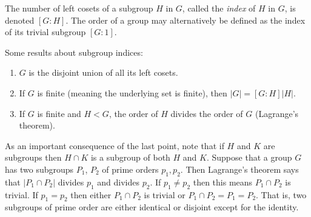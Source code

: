 \begin{defn}
The number of left cosets of a subgroup $H$ in $G$, called the \emph{index} of
$H$ in $G$, is denoted $[G:H]$. The order of a group may alternatively
be defined as the index of its trivial subgroup $[G : 1]$.
\end{defn}

\begin{corol}
Some results about subgroup indices:
\begin{enumerate}
  \item{$G$ is the disjoint union of all its left cosets.}
  \item{If $G$ is finite (meaning the underlying set is finite), then
        $|G| = [G:H] |H|$.}
  \item{If $G$ is finite and $H < G$, the order of $H$ divides the
        order of $G$ (Lagrange's theorem).}
\end{enumerate}
\end{corol}

As an important consequence of the last point, note that if $H$ and
$K$ are subgroups then $H \cap K$ is a subgroup of both $H$ and
$K$. Suppose that a group $G$ has two subgroups
$P_1$, $P_2$ of prime orders $p_1, p_2$. Then Lagrange's theorem says that
$|P_1 \cap P_2|$ divides $p_1$ and divides $p_2$. If $p_1 \neq p_2$
then this means $P_1 \cap P_2$ is trivial. If $p_1 = p_2$ then either
$P_1 \cap P_2$ is trivial or $P_1 \cap P_2 = P_1 = P_2$.
That is, two subgroups of prime order are either identical or disjoint
except for the identity.

